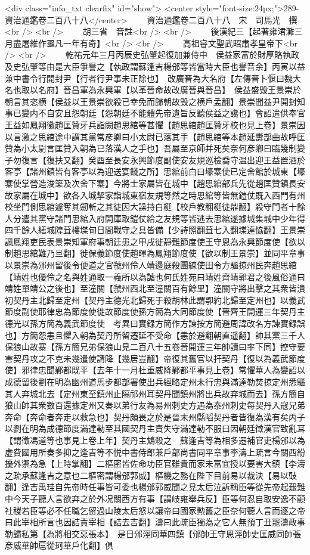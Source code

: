 <div class="info_txt clearfix" id="show">
<center style="font-size:24px;">289-資治通鑑卷二百八十八</center>
  　　資治通鑑卷二百八十八　宋　司馬光　撰<br />
<br />
　　胡三省　音註<br />
<br />
　　後漢紀三【起著雍涒灘三月盡屠維作噩凡一年有奇】<br />
<br />
　　高祖睿文聖武昭肅孝皇帝下<br />
<br />
　　乾祐元年三月丙辰史弘肇起復加兼侍中　侯益家富於財厚賂執政及史弘肇等由是大臣爭譽之【執政謂蘇逢吉楊邠等皆當時大臣也譽音余】丙寅以益兼中書令行開封尹【行者行尹事未正除也】　改廣晉為大名府【左傳晉卜偃曰魏大名也取以名府】晉昌軍為永興軍【以革晉命故改廣晉與晉昌】　侯益盛毁王景崇於朝言其恣横【侯益以王景崇欲殺已幸免而歸朝故毁之横戶孟翻】景崇聞益尹開封知事已變内不自安且怨朝廷【怨朝廷不能體先帝遺旨反聽侯益之讒也】會詔遣供奉官王益如鳳翔徵趙匡贊牙兵詣闕趙思綰等甚懼【趙思綰趙匡贊牙校也見上卷】景崇因以言激之思綰途中謂其黨常彦卿曰小太尉已落其手【趙思綰等本趙延夀部曲故呼匡贊為小太尉言匡贊入朝為已落漢人之手也】吾屬至京師并死矣奈何彦卿曰臨幾制變子勿復言【復扶又翻】癸酉至長安永興節度副使安友規巡檢喬守温出迎王益置酒於客亭【諸州鎮皆有客亭以為迎送宴餞之所】思綰前白曰壕寨使已定舍館於城東【壕寨使掌營造浚築及次舍下寨】今將士家屬皆在城中【趙思綰部兵先從趙匡贊鎮長安故家屬在城中】欲各入城挈家詣城東宿友規等然之時思綰等皆無鎧仗既入西門有州校坐門側思綰遽奪其劒斬之其徒因大譟持白梃【校戶教翻梃徒鼎翻】殺守門者十餘人分遣其黨守諸門思綰入府開庫取鎧仗給之友規等皆逃去思綰遂據城集城中少年得四千餘人繕城隍葺樓堞旬日間戰守之具皆備【少詩照翻葺七入翻堞達恊翻】王景崇諷鳳翔吏民表景崇知軍府事朝廷患之甲戌徙靜難節度使王守恩為永興節度使【欲以制趙思綰難乃旦翻】徙保義節度使趙暉為鳳翔節度使【欲以制王景崇】並同平章事以景崇為邠州留後令便道之官虢州伶人靖邊庭殺團練使田令方驅掠州民奔趙思綰【靖姓也優伶之名與姓通取一義所以為謔也何氏姓苑曰靖姓齊靖郭君之後風俗通曰靖姓單靖公之後也】至潼關【虢州西北至潼關百有餘里】潼關守將出擊之其衆皆潰　初契丹主北歸至定州【契丹主德光北歸死于殺胡林此謂卾約北歸至定州也】以義武節度副使耶律忠為節度使徙故節度使孫方簡為大同節度使【晉齊王開運三年契丹主德光以孫方簡為義武節度使　考異曰實録方簡作方諫按方簡避周諱改名方諫實録誤也】方簡怨恚且懼入朝為契丹所留遷延不受命【恚於避翻朝直遥翻】帥其黨三千人保狼山故寨【孫方簡兄弟保狼山見二百八十五卷晉開運三年帥讀曰率下同】控守要害契丹攻之不克未幾遣使請降【幾居豈翻】帝復其舊官以扞契丹【復以為義武節度使】邪律忠聞鄴都既平【去年十一月杜重威降鄴都平事見上卷】常懼華人為變詔以成德留後劉在明為幽州道馬步都部署使出兵經略定州未行忠與滿達勒焚掠定州悉驅其人弃城北去【定州東至鎮州止隔祁州耳契丹聞鎮州將出兵故弃城而去】孫方簡自狼山帥其衆數百還據定州又奏以弟行友為易州刺史方遇為泰州刺史每契丹入寇兄弟奔命【奔命者奔走以救急也】契丹頗畏之於是晉末州縣䧟契丹者皆復為漢有矣丙子以劉在明為成德節度滿達勒至其國契丹主責失守滿達勒不服曰因朝廷徵漢官致亂耳【謂徵馮道等也事見上卷上年】契丹主鴆殺之　蘇逢吉等為相多遷補官吏楊邠以為虚費國用所奏多抑之逢吉等不悦中書侍郎兼戶部尚書同平章事李濤上疏言今關西紛擾外禦為急【上時掌翻】二樞密皆佐命功臣官雖貴而家未富宜授以要害大鎮【李濤之疏承蘇逢吉之意也二樞密謂楊邠郭威】樞機之務在陛下目前易以裁決【易以䜴翻】逢吉禹珪自先帝時任事皆可委也楊邠郭威聞之見太后泣訴稱臣等從先帝起艱難中今天子聽人言欲弃之於外况關西方有事【謂岐雍舉兵反】臣等何忍自取安逸不顧社稷若臣等必不任職乞留過山陵太后怒以讓帝曰國家勲舊之臣奈何聽人言而逐之帝曰此宰相所言也因詰責宰相【詰去吉翻】濤曰此疏臣獨為之它人無預丁丑罷濤政事勒歸私第【為將相交惡張本】　是日邠涇同華四鎮【邠帥王守恩涇帥史匡威同帥張彦威華帥扈從珂華戶化翻】俱